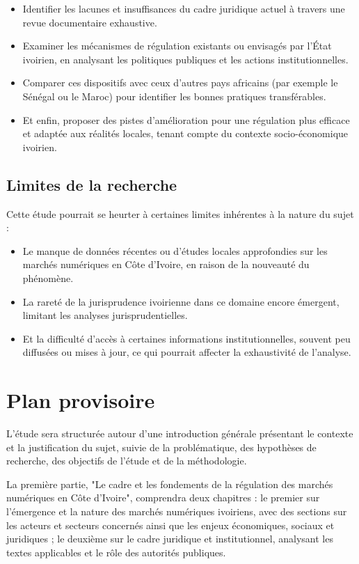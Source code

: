 \begin{itemize}
\item Identifier les lacunes et insuffisances du cadre juridique actuel à travers une revue documentaire exhaustive.
\item Examiner les mécanismes de régulation existants ou envisagés par l'État ivoirien, en analysant les politiques publiques et les actions institutionnelles.
\item Comparer ces dispositifs avec ceux d'autres pays africains (par exemple le Sénégal ou le Maroc) pour identifier les bonnes pratiques transférables.
\item Et enfin, proposer des pistes d'amélioration pour une régulation plus efficace et adaptée aux réalités locales, tenant compte du contexte socio-économique ivoirien.
\end{itemize}

\subsection*{Limites de la recherche}

Cette étude pourrait se heurter à certaines limites inhérentes à la nature du sujet :

\begin{itemize}
\item Le manque de données récentes ou d'études locales approfondies sur les marchés numériques en Côte d'Ivoire, en raison de la nouveauté du phénomène.
\item La rareté de la jurisprudence ivoirienne dans ce domaine encore émergent, limitant les analyses jurisprudentielles.
\item Et la difficulté d'accès à certaines informations institutionnelles, souvent peu diffusées ou mises à jour, ce qui pourrait affecter la exhaustivité de l'analyse.
\end{itemize}

\section*{Plan provisoire}

L'étude sera structurée autour d'une introduction générale présentant le contexte et la justification du sujet, suivie de la problématique, des hypothèses de recherche, des objectifs de l'étude et de la méthodologie.

La première partie, "Le cadre et les fondements de la régulation des marchés numériques en Côte d'Ivoire", comprendra deux chapitres : le premier sur l'émergence et la nature des marchés numériques ivoiriens, avec des sections sur les acteurs et secteurs concernés ainsi que les enjeux économiques, sociaux et juridiques ; le deuxième sur le cadre juridique et institutionnel, analysant les textes applicables et le rôle des autorités publiques.

